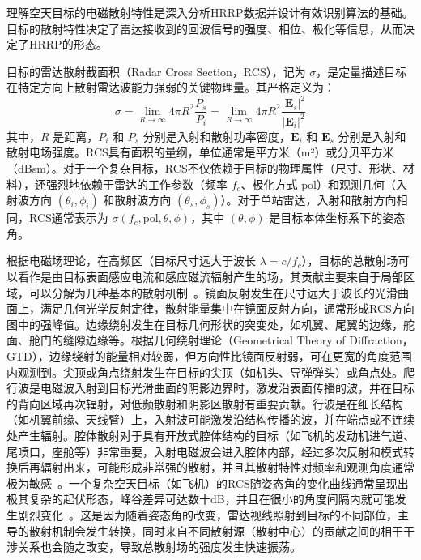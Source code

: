 理解空天目标的电磁散射特性是深入分析HRRP数据并设计有效识别算法的基础。目标的散射特性决定了雷达接收到的回波信号的强度、相位、极化等信息，从而决定了HRRP的形态。

目标的雷达散射截面积（Radar Cross Section，RCS），记为 $\sigma$，是定量描述目标在特定方向上散射雷达波能力强弱的关键物理量。其严格定义为：
\begin{equation}
    \sigma = \lim_{R \to \infty} 4\pi R^2 \frac{P_s}{P_i} = \lim_{R \to \infty} 4\pi R^2 \frac{|\mathbf{E}_s|^2}{|\mathbf{E}_i|^2}
    \label{eq:rcs_definition}
\end{equation}
其中，$R$ 是距离，$P_i$ 和 $P_s$ 分别是入射和散射功率密度，$\mathbf{E}_i$ 和 $\mathbf{E}_s$ 分别是入射和散射电场强度。RCS具有面积的量纲，单位通常是平方米（m²）或分贝平方米（dBsm）。对于一个复杂目标，RCS不仅依赖于目标的物理属性（尺寸、形状、材料），还强烈地依赖于雷达的工作参数（频率 $f_c$、极化方式 $\text{pol}$）和观测几何（入射波方向 $(\theta_i, \phi_i)$ 和散射波方向 $(\theta_s, \phi_s)$）。对于单站雷达，入射和散射方向相同，RCS通常表示为 $\sigma(f_c, \text{pol}, \theta, \phi)$，其中 $(\theta, \phi)$ 是目标本体坐标系下的姿态角。

根据电磁场理论，在高频区（目标尺寸远大于波长 $\lambda = c/f_c$），目标的总散射场可以看作是由目标表面感应电流和感应磁流辐射产生的场，其贡献主要来自于局部区域，可以分解为几种基本的散射机制~\cite{X}。镜面反射发生在尺寸远大于波长的光滑曲面上，满足几何光学反射定律，散射能量集中在镜面反射方向，通常形成RCS方向图中的强峰值。边缘绕射发生在目标几何形状的突变处，如机翼、尾翼的边缘，舵面、舱门的缝隙边缘等。根据几何绕射理论（Geometrical Theory of Diffraction，GTD），边缘绕射的能量相对较弱，但方向性比镜面反射弱，可在更宽的角度范围内观测到。尖顶或角点绕射发生在目标的尖顶（如机头、导弹弹头）或角点处。爬行波是电磁波入射到目标光滑曲面的阴影边界时，激发沿表面传播的波，并在目标的背向区域再次辐射，对低频散射和阴影区散射有重要贡献。行波是在细长结构（如机翼前缘、天线臂）上，入射波可能激发沿结构传播的波，并在端点或不连续处产生辐射。腔体散射对于具有开放式腔体结构的目标（如飞机的发动机进气道、尾喷口，座舱等）非常重要，入射电磁波会进入腔体内部，经过多次反射和模式转换后再辐射出来，可能形成非常强的散射，并且其散射特性对频率和观测角度通常极为敏感~\cite{X}。一个复杂空天目标（如飞机）的RCS随姿态角的变化曲线通常呈现出极其复杂的起伏形态，峰谷差异可达数十dB，并且在很小的角度间隔内就可能发生剧烈变化~\cite{X}。这是因为随着姿态角的改变，雷达视线照射到目标的不同部位，主导的散射机制会发生转换，同时来自不同散射源（散射中心）的贡献之间的相干干涉关系也会随之改变，导致总散射场的强度发生快速振荡。

